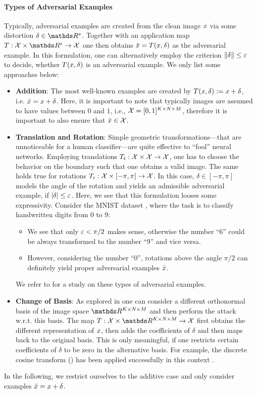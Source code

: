 \paragraph{Types of Adversarial Examples} Typically, adversarial examples are created from the clean image $x$ via some distortion $\delta\in\R^s$. Together with an application map $T:\Inp\times\R^s\to\Inp$ one then obtains $\bar{x}=T(x,\delta)$ as the adversarial example. In this formulation, one can alternatively employ the criterion $\left\|\delta\right\|\leq \varepsilon$ to decide, whether $T(x,\delta)$ is an adversarial example. We only list some approaches below:
%
\begin{itemize}
\item\textbf{Addition}: The most well-known examples are created by $T(x,\delta):=x+\delta$, i.e. $\bar{x} = x + \delta$. Here, it is important to note that typically images are assumed to have values between $0$ and $1$, i.e., $\mathcal{X}=[0,1]^{K\times N\times M}$, therefore it is important to also ensure that $\bar{x}\in\mathcal{X}$.
%
\item\textbf{Translation and Rotation}: Simple geometric transformations---that are unnoticeable for a human classifier---are quite effective to \enquote{fool} neural networks. Employing translations $T_{\text{t}}:\mathcal{X}\times\mathcal{X}\to\mathcal{X}$, one has to choose the behavior on the boundary such that one obtains a valid image. The same holds true for rotations $T_{\text{r}}:\mathcal{X}\times [-\pi,\pi]\to\mathcal{X}$. In this case, $\delta\in[-\pi,\pi]$ models the angle of the rotation and yields an admissible adversarial example, if $\left|\delta\right|\leq \varepsilon$. Here, we see that this formulation looses some expressivity. Consider the MNIST dataset \cite{leCun10}, where the task is to classify handwritten digits from $0$ to $9$:
%
\begin{itemize}
\item We see that only $\varepsilon<\pi/2$ makes sense, otherwise the number \enquote{6} could be always transformed to the number \enquote{9} and vice versa.
\item However, considering the number \enquote{0}, rotations above the angle $\pi/2$ can definitely yield proper adversarial examples $\bar{x}$.
\end{itemize}
%
We refer to \cite{engstrom2018rotation} for a study on these types of adversarial examples.
%
\item\textbf{Change of Basis}: As explored in \cite{guo2017countering} one can consider a different orthonormal basis of the image space $\R^{K\times N\times M}$ and then perform the attack w.r.t. this basis. 
The map $T:\Inp\times\R^{K\times N\times M}\to\Inp$ first obtains the different representation of $x$, then adds the coefficients of $\delta$ and then maps back to the original basis. This is only meaningful, if one restricts certain coefficients of $\delta$ to be zero in the alternative basis. For example, the discrete cosine transform (\cite{ahmed1974discrete}) has been applied successfully in this context \cite{guo2017countering}.
\end{itemize}
%
%
In the following, we restrict ourselves to the additive case and only consider examples $\bar{x} = x + \delta$.
%
%
